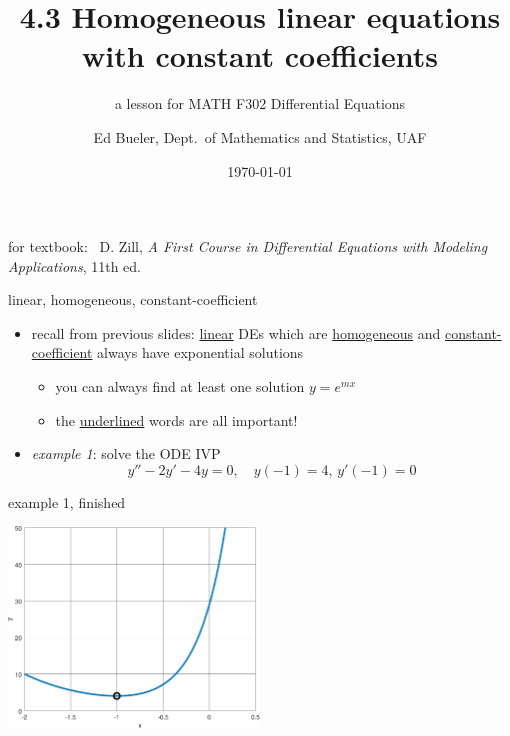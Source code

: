 \documentclass{beamer}
\title{4.3 Homogeneous linear equations \\ with constant coefficients}
\subtitle{a lesson for MATH F302 Differential Equations}
\author{Ed Bueler, Dept.~of Mathematics and Statistics, UAF}
\date{\tiny \today}
\begin{document}


\begin{frame}
\titlepage

\centerline{\tiny for textbook: \, D. Zill, \emph{A First Course in Differential Equations with Modeling Applications}, 11th ed.}
\end{frame}


\begin{frame}{linear, homogeneous, constant-coefficient}

\begin{itemize}
\item recall from previous slides: \underline{linear} DEs which are \underline{homogeneous} and \underline{constant-coefficient} always have exponential solutions
    \begin{itemize}
    \item you can always find at least one solution $y=e^{mx}$
    \item the \underline{underlined} words are all important!
    \end{itemize}
\item \emph{example 1}: solve the ODE IVP
    $$y'' -2 y' - 4 y = 0, \quad y(-1)=4, \, y'(-1)=0$$

\vspace{30mm}
\end{itemize}
\end{frame}


\begin{frame}{example 1, finished}

\vspace{35mm}

\hfill \includegraphics[width=0.5\textwidth]{figs/expodeivp2nd}
\end{frame}
\end{document}
